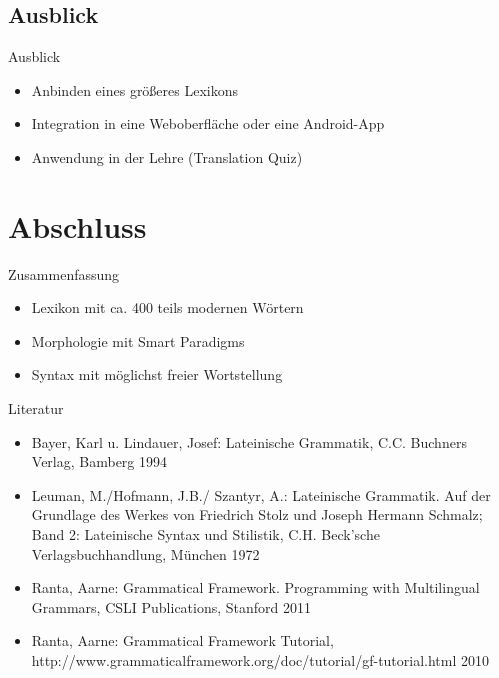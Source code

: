 \documentclass{beamer}
\begin{document}
\subsection{Ausblick}
\begin{frame}{Ausblick}
\begin{itemize}
\item Anbinden eines größeres Lexikons
\item Integration in eine Weboberfläche oder eine Android-App
\item Anwendung in der Lehre (Translation Quiz)
\end{itemize}
\end{frame}
\section{Abschluss}
\begin{frame}{Zusammenfassung}
\begin{itemize}
  \item Lexikon mit ca. 400 teils modernen Wörtern
  \item Morphologie mit Smart Paradigms
  \item Syntax mit möglichst freier Wortstellung
\end{itemize}
\end{frame}
\begin{frame}{Literatur}
\begin{itemize}
  \item Bayer, Karl u. Lindauer, Josef: Lateinische Grammatik, C.C. Buchners Verlag, Bamberg 1994
  \item Leuman, M./Hofmann, J.B./ Szantyr, A.: Lateinische Grammatik. Auf der Grundlage des Werkes von Friedrich Stolz und Joseph Hermann Schmalz; Band 2: Lateinische Syntax und Stilistik, C.H. Beck'sche Verlagsbuchhandlung, München 1972
  \item Ranta, Aarne: Grammatical Framework. Programming with Multilingual Grammars, CSLI Publications, Stanford 2011 
  \item Ranta, Aarne: Grammatical Framework Tutorial, http://www.grammaticalframework.org/doc/tutorial/gf-tutorial.html 2010
\end{itemize}
\end{frame}
\end{document}
